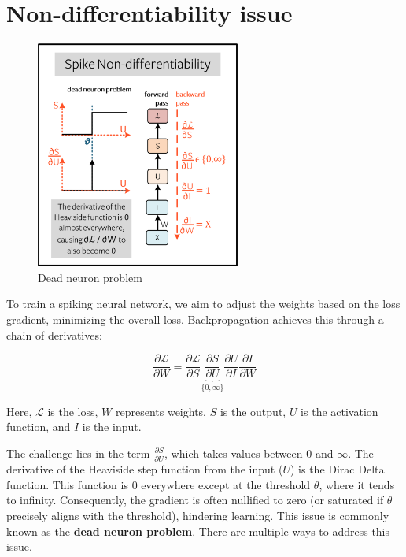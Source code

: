 \documentclass[11pt]{article}
\begin{document}
\pagebreak

\section{Non-differentiability issue}

\begin{figure}
  \centering
  \includegraphics[width=0.6\textwidth]{./image/non-differentiability.png}
  \caption{Dead neuron problem}
\end{figure}

To train a spiking neural network, we aim to adjust the weights based on the loss gradient, minimizing the overall loss. Backpropagation achieves this through a chain of derivatives:

$$
\frac{\partial \mathcal{L}}{\partial W} =
\frac{\partial \mathcal{L}}{\partial S}
\underbrace{\frac{\partial S}{\partial U}}_{\{0, \infty\}}
\frac{\partial U}{\partial I}
\frac{\partial I}{\partial W}
$$

Here, $\mathcal{L}$ is the loss, $W$ represents weights, $S$ is the output, $U$ is the activation function, and $I$ is the input.

The challenge lies in the term $\frac{\partial S}{\partial U}$, which takes values between $0$ and $\infty$. The derivative of the Heaviside step function from the input ($U$) is the Dirac Delta function. This function is $0$ everywhere except at the threshold $\theta$, where it tends to infinity. Consequently, the gradient is often nullified to zero (or saturated if $\theta$ precisely aligns with the threshold), hindering learning. This issue is commonly known as the \textbf{dead neuron problem}. There are multiple ways to address this issue.
\end{document}
